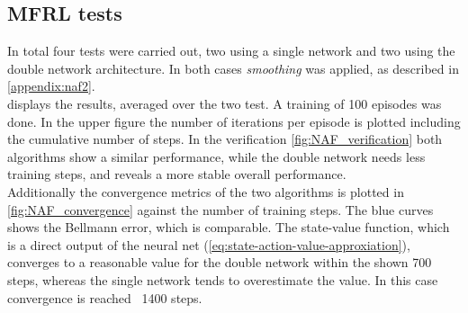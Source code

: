 \documentclass[
 reprint,
 amsmath,amssymb,amsfonts,clevref,
 aps,
prstab,
]{revtex4-2}
\begin{document}
\subsection{MFRL tests}
In total four tests were carried out, two using a single network and two using the double network architecture. In both cases \emph{smoothing} was applied, as described in \cref{appendix:naf2}.\\
 displays the results, averaged over the two test. A training of 100 episodes was done. In the upper figure the number of iterations per episode is plotted including the cumulative number of steps.
In the verification \cref{fig:NAF_verification} both algorithms show a similar performance, while the double network needs less training steps, and reveals a more stable overall performance.\\
Additionally the convergence metrics of the two algorithms is plotted in \cref{fig:NAF_convergence} against the number of training steps. The blue curves shows the Bellmann error, which is comparable. The state-value function, which is a direct output of the neural net (\cref{eq:state-action-value-approxiation}), converges to a reasonable value for the double network within the shown 700 steps, whereas the single network tends to overestimate the value. In this case convergence is reached ~1400 steps.\\
\end{document}

